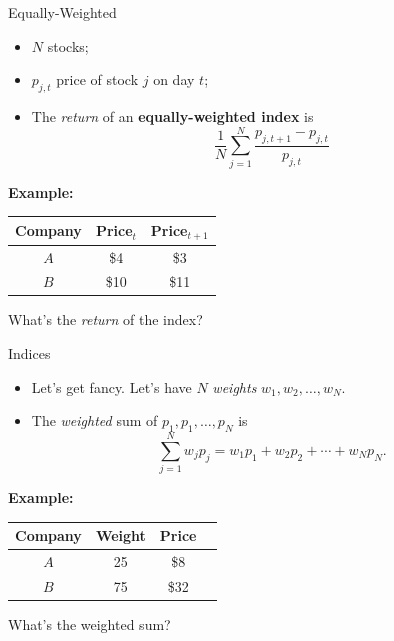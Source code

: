 \documentclass{beamer}
\begin{document}
\begin{frame}{Equally-Weighted}
\begin{itemize}
\item $N$ stocks; 
\item $p_{j,t}$ price of stock $j$ on day $t$; 
\item The \textit{return} of an \textbf{equally-weighted index} is
\begin{equation}
\frac{1}{N}\sum_{j=1}^{N}{\frac{p_{j,t+1}-p_{j,t}}{p_{j,t}}}
\end{equation}
\end{itemize}
\textbf{Example:}
\begin{center}
\begin{tabular}{ccc}
\textbf{Company} & \textbf{Price$_{t}$} & \textbf{Price$_{t+1}$} \\ \hline
$A$ & \$4 & \$3 \\
$B$ & \$10 & \$11
\end{tabular}
\end{center}
\begin{center}
What's the \textit{return} of the index?
\end{center}
\end{frame}

\begin{frame}{Indices}
\begin{itemize}
\item Let's get fancy. Let's have $N$ \textit{weights} $w_{1},w_{2},\ldots,w_{N}$. 
\item The \textit{weighted} sum of $p_{1},p_{1},\ldots,p_{N}$ is
\begin{equation}
\sum_{j=1}^{N}{w_{j}p_{j}}=w_{1}p_{1}+w_{2}p_{2}+\cdots+w_{N}p_{N}.
\end{equation}
\end{itemize}
\textbf{Example:}
\begin{center}
\begin{tabular}{cccc}
\textbf{Company} & \textbf{Weight} & \textbf{Price} \\ \hline
$A$ & 25 & \$8 \\
$B$ & 75 & \$32
\end{tabular}
\end{center}
\begin{center}
What's the weighted sum? 
\end{center}
\end{frame}
\end{document}
